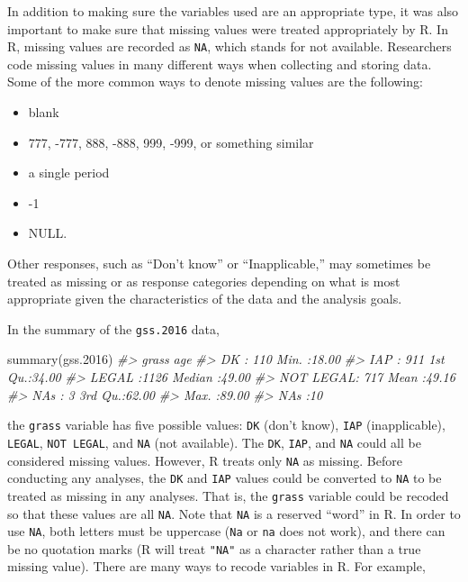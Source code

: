 \documentclass[
]{book}
\newenvironment{Shaded}{\begin{snugshade}}{\end{snugshade}}
\newcommand{\CommentTok}[1]{\textcolor[rgb]{0.56,0.35,0.01}{\textit{#1}}}
\newcommand{\FloatTok}[1]{\textcolor[rgb]{0.00,0.00,0.81}{#1}}
\newcommand{\FunctionTok}[1]{\textcolor[rgb]{0.00,0.00,0.00}{#1}}
\newcommand{\NormalTok}[1]{#1}
\providecommand{\tightlist}{%
  \setlength{\itemsep}{0pt}\setlength{\parskip}{0pt}}
\begin{document}
In addition to making sure the variables used are an appropriate type, it was also important to make sure that missing values were treated appropriately by R. In R, missing values are recorded as \texttt{NA}, which stands for not available. Researchers code missing values in many different ways when collecting and storing data. Some of the more common ways to denote missing values are the following:

\begin{itemize}
\tightlist
\item
  blank
\item
  777, -777, 888, -888, 999, -999, or something similar
\item
  a single period
\item
  -1
\item
  NULL.
\end{itemize}

Other responses, such as ``Don't know'' or ``Inapplicable,'' may sometimes be treated as missing or as response categories depending on what is most appropriate given the characteristics of the data and the analysis goals.

In the summary of the \texttt{gss.2016} data,

\begin{Shaded}
\begin{Highlighting}[]
\FunctionTok{summary}\NormalTok{(gss}\FloatTok{.2016}\NormalTok{)}
\CommentTok{\#\textgreater{}        grass           age       }
\CommentTok{\#\textgreater{}  DK       : 110   Min.   :18.00  }
\CommentTok{\#\textgreater{}  IAP      : 911   1st Qu.:34.00  }
\CommentTok{\#\textgreater{}  LEGAL    :1126   Median :49.00  }
\CommentTok{\#\textgreater{}  NOT LEGAL: 717   Mean   :49.16  }
\CommentTok{\#\textgreater{}  NA\textquotesingle{}s     :   3   3rd Qu.:62.00  }
\CommentTok{\#\textgreater{}                   Max.   :89.00  }
\CommentTok{\#\textgreater{}                   NA\textquotesingle{}s   :10}
\end{Highlighting}
\end{Shaded}

the \texttt{grass} variable has five possible values: \texttt{DK} (don't know), \texttt{IAP} (inapplicable), \texttt{LEGAL}, \texttt{NOT\ LEGAL}, and \texttt{NA} (not available). The \texttt{DK}, \texttt{IAP}, and \texttt{NA} could all be considered missing values. However, R treats only \texttt{NA} as missing. Before conducting any analyses, the \texttt{DK} and \texttt{IAP} values could be converted to \texttt{NA} to be treated as missing in any analyses. That is, the \texttt{grass} variable could be recoded so that these values are all \texttt{NA}. Note that \texttt{NA} is a reserved ``word'' in R. In order to use \texttt{NA}, both letters must be uppercase (\texttt{Na} or \texttt{na} does not work), and there can be no quotation marks (R will treat \texttt{"NA"} as a character rather than a true missing value). There are many ways to recode variables in R. For example,
\end{document}
